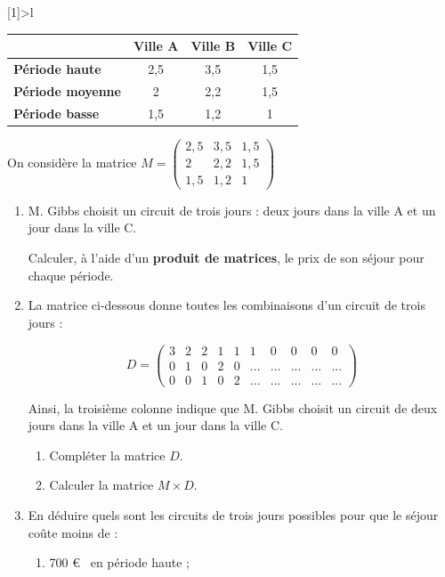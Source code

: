 \documentclass[12pt,french]{book}
\begin{document}
\begin{spacing}{1.2}
\begin{center}
\newcolumntype{K}[1]{>{}l}
\begin{tabular}{|K{gray}|*{3}{c|}}
 &  \bf Ville A & \bf Ville B & \bf Ville C\\
\hline
\bf Période haute & 2,5 & 3,5 & 1,5\\
\hline
\bf Période moyenne & 2 & 2,2 & 1,5\\
\hline
\bf Période basse & 1,5 & 1,2 & 1\\
\hline
\end{tabular}
\end{center}

On considère la matrice $M=\begin{pmatrix}
2,5&3,5&1,5\\2&2,2&1,5\\1,5&1,2&1
\end{pmatrix}$

\begin{enumerate}
\item M. Gibbs choisit un circuit de trois jours : deux jours dans la ville A et un jour dans la ville C.

Calculer, à l'aide d'un \textbf{produit de matrices}, le prix de son séjour pour chaque période.

\item La matrice ci-dessous donne toutes les combinaisons d'un circuit de trois jours :

\[D=\begin{pmatrix}
3&2&2&1&1&1&0&0&0&0\\
0&1&0&2&0&...&...&...&...&...\\
0&0&1&0&2&...&...&...&...&...
\end{pmatrix}\]

Ainsi, la troisième colonne indique que M. Gibbs choisit un circuit de deux jours dans la ville A et un jour dans la ville C.

	\begin{enumerate}
	\item Compléter la matrice $D$.
	
	\item Calculer la matrice $M\times D$.
	
	\end{enumerate}
\item En déduire quels sont les circuits de trois jours possibles pour que le séjour coûte moins de :
	\begin{enumerate}
	\item 700 \euro~ en période haute ;
	

\end{enumerate}
\end{enumerate}
\end{spacing}
\end{document}
